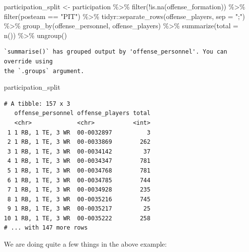 \documentclass[
  letterpaper,
]{krantz}
\newenvironment{Shaded}{\begin{snugshade}}{\end{snugshade}}
\newcommand{\AttributeTok}[1]{\textcolor[rgb]{0.40,0.45,0.13}{#1}}
\newcommand{\FunctionTok}[1]{\textcolor[rgb]{0.28,0.35,0.67}{#1}}
\newcommand{\NormalTok}[1]{\textcolor[rgb]{0.00,0.23,0.31}{#1}}
\newcommand{\OtherTok}[1]{\textcolor[rgb]{0.00,0.23,0.31}{#1}}
\newcommand{\SpecialCharTok}[1]{\textcolor[rgb]{0.37,0.37,0.37}{#1}}
\newcommand{\StringTok}[1]{\textcolor[rgb]{0.13,0.47,0.30}{#1}}
\begin{document}
\begin{Shaded}
\begin{Highlighting}[]
\NormalTok{participation\_split }\OtherTok{\textless{}{-}}\NormalTok{ participation }\SpecialCharTok{\%\textgreater{}\%}
  \FunctionTok{filter}\NormalTok{(}\SpecialCharTok{!}\FunctionTok{is.na}\NormalTok{(offense\_formation)) }\SpecialCharTok{\%\textgreater{}\%}
  \FunctionTok{filter}\NormalTok{(posteam }\SpecialCharTok{==} \StringTok{"PIT"}\NormalTok{) }\SpecialCharTok{\%\textgreater{}\%}
\NormalTok{  tidyr}\SpecialCharTok{::}\FunctionTok{separate\_rows}\NormalTok{(offense\_players, }\AttributeTok{sep =} \StringTok{";"}\NormalTok{) }\SpecialCharTok{\%\textgreater{}\%}
  \FunctionTok{group\_by}\NormalTok{(offense\_personnel, offense\_players) }\SpecialCharTok{\%\textgreater{}\%}
  \FunctionTok{summarize}\NormalTok{(}\AttributeTok{total =} \FunctionTok{n}\NormalTok{()) }\SpecialCharTok{\%\textgreater{}\%}
  \FunctionTok{ungroup}\NormalTok{()}
\end{Highlighting}
\end{Shaded}

\begin{verbatim}
`summarise()` has grouped output by 'offense_personnel'. You can override using
the `.groups` argument.
\end{verbatim}

\begin{Shaded}
\begin{Highlighting}[]
\NormalTok{participation\_split}
\end{Highlighting}
\end{Shaded}

\begin{verbatim}
# A tibble: 157 x 3
   offense_personnel offense_players total
   <chr>             <chr>           <int>
 1 1 RB, 1 TE, 3 WR  00-0032897          3
 2 1 RB, 1 TE, 3 WR  00-0033869        262
 3 1 RB, 1 TE, 3 WR  00-0034142         37
 4 1 RB, 1 TE, 3 WR  00-0034347        781
 5 1 RB, 1 TE, 3 WR  00-0034768        781
 6 1 RB, 1 TE, 3 WR  00-0034785        744
 7 1 RB, 1 TE, 3 WR  00-0034928        235
 8 1 RB, 1 TE, 3 WR  00-0035216        745
 9 1 RB, 1 TE, 3 WR  00-0035217         25
10 1 RB, 1 TE, 3 WR  00-0035222        258
# ... with 147 more rows
\end{verbatim}

We are doing quite a few things in the above example:
\end{document}
